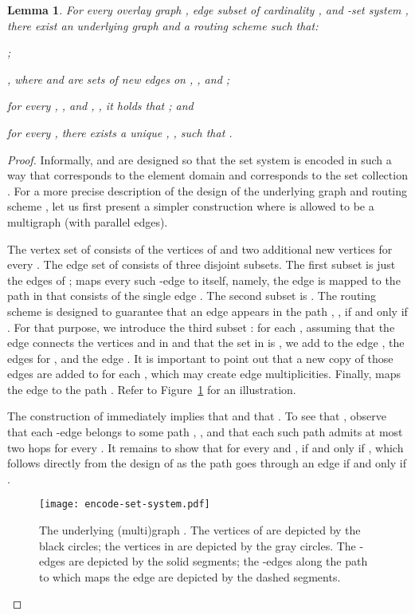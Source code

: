 \LongVersion \documentclass[11pt]{article}
\newtheorem{lemma}[theorem]{Lemma}
\theoremstyle{definition}
\theoremstyle{plain}
\newcounter{smallitemizec}
\newenvironment{smallitemize}
{   \setcounter{smallitemizec}{0}
    \vspace{-0.5ex}
  \begin{list}{}
    {\usecounter{smallitemizec}
      \setlength{\parsep}{0pt}
      \setlength{\itemsep}{0pt}}
    }{ \end{list}
   \vspace{-0.5ex}
}
\begin{document}
\begin{lemma} \label{result:EncodeSetSystem}
For every overlay graph , edge subset  of
cardinality , and -set system , there exist an
underlying graph  and a routing scheme  such that: 
\begin{smallitemize}
\item[\rm (1)]
;
\item[\rm (2)]
, where
 and  are sets of new edges on , , and
;
\item[\rm (3)]
for every , , and , , it holds
that ; and
\item[\rm (4)]
for every , there exists a unique , ,
such that .
\end{smallitemize}
\end{lemma}
\begin{proof}
Informally,  and  are designed so that the set system 
is encoded in such a way that  corresponds to the element domain 
and  corresponds to the set collection . For a more precise description 
of the design of the underlying graph  and routing scheme , 
let us first present a simpler construction where  is allowed to be 
a multigraph (with parallel edges).

The vertex set of  consists of the vertices of  and two additional new
vertices  for every .
The edge set of  consists of three disjoint subsets.
The first subset is just the edges of ;
 maps every such -edge to itself, namely, the edge 
 is mapped to the path in 
that consists of the single edge .
The second subset is .
The routing scheme  is designed to guarantee that an edge  appears in the path , , if and only if .
For that purpose, we introduce the third subset :
for each , assuming that the edge  connects the vertices
 and  in  and that the  set in  is , we add to  the edge , the edges  for , and the edge .
It is important to point out that a new copy of those edges are added to
 for each , which may create edge multiplicities.
Finally,  maps the edge  to the path .
Refer to Figure~\ref{figure:EncodeSetSystem} for an illustration.

The construction of  immediately implies that  and that .
To see that , observe that each
-edge belongs to some path , , and that each such
path admits at most two hops for every .
It remains to show that for every  and ,  if and only if , which follows directly
from the design of  as the path  goes through an edge  if and only if .

\begin{figure}
\begin{center}
\texttt{[image: encode-set-system.pdf]}
\end{center}
\caption{\label{figure:EncodeSetSystem}
The underlying (multi)graph .
The vertices of  are depicted by the black circles;
the vertices in  are depicted by
the gray circles.
The -edges are depicted by the solid segments;
the -edges along the path  to which  maps the edge  are depicted by the dashed segments.
}
\vspace*{-.5cm}
\end{figure}


\end{proof}
\end{document}
